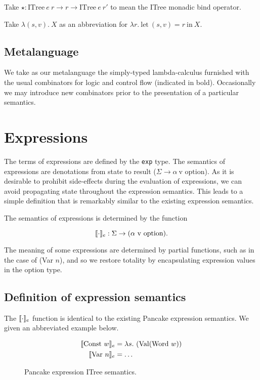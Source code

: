 \documentclass{article}
\begin{document}
Take $\star : \text{ITree}\ e\ r \to r \to \text{ITree}\ e\ r'$ to mean the ITree monadic bind operator.

Take $\lambda(s,v).\ X$ as an abbreviation for $\lambda r.\ \text{let}\ (s,v) = r\ \text{in}\ X$.

\subsection{Metalanguage}
\label{sec:metalanguage}

We take as our metalanguage the simply-typed lambda-calculus furnished with the usual combinators for logic and control flow (indicated in bold). Occasionally we may introduce new combinators prior to the presentation of a particular semantics.

\section{Expressions}
\label{sec:expressions}

The terms of expressions are defined by the \texttt{exp} type. The semantics of expressions are denotations from state to result ($\Sigma \to \alpha\ \text{v option}$). As it is desirable to prohibit side-effects during the evaluation of expressions, we can avoid propagating state throughout the expression semantics. This leads to a simple definition that is remarkably similar to the existing expression semantics.

The semantics of expressions is determined by the function

\begin{equation}
  \label{eq:1}
  \sem{\cdot}_{e} : \Sigma \to (\alpha\ \text{v}\ \text{option}).
\end{equation}

The meaning of some expressions are determined by partial functions, such as in the case of (Var $n$), and so we restore totality by encapsulating expression values in the option type.

\subsection{Definition of expression semantics}
\label{sec:defin-expr-semant}

The $\llbracket \cdot \rrbracket_{e}$ function is identical to the existing Pancake expression semantics. We given an abbreviated example below.

\begin{figure}[H]
  \centering
  \begin{align*}
    \sem{\text{Const } w}_{e} &= \abs{s} (\text{Val} (\text{Word}\ w))\\
    \sem{\text{Var } n}_{e} &= \dots\\
  \end{align*}
  \caption{Pancake expression ITree semantics.}
  \label{fig:sem_exp}
\end{figure}
\end{document}
